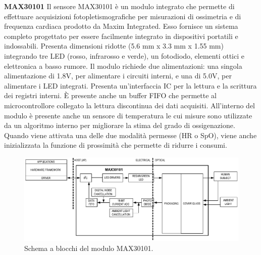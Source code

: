\textbf{MAX30101} Il sensore MAX30101 è un modulo integrato che permette di effettuare acquisizioni fotopletismografiche per misurazioni di ossimetria e di frequenza cardiaca prodotto da Maxim Integrated\cite{IntegratedMAX30101}. Esso fornisce un sistema completo progettato per essere facilmente integrato in dispositivi portatili e indossabili. Presenta dimensioni ridotte (5.6 mm x 3.3 mm x 1.55 mm) integrando tre LED (rosso, infrarosso e verde), un fotodiodo, elementi ottici e elettronica a basso rumore. Il modulo richiede due alimentazioni: una singola alimentazione di 1.8V, per alimentare i circuiti interni, e una di 5.0V, per alimentare i LED integrati. Presenta un'interfaccia IC per la lettura e la scrittura dei registri interni. \`E presente anche un buffer FIFO che permette al microcontrollore collegato la lettura discontinua dei dati acquisiti. All'interno del modulo è presente anche un sensore di temperatura le cui misure sono utilizzate da un algoritmo interno per migliorare la stima del grado di ossigenazione. Quando viene attivata una delle due modalità permesse (HR o SpO), viene anche inizializzata la funzione di prossimità che permette di ridurre i consumi.   
\begin{figure}[tb]
	\centering
	\includegraphics[width=1\linewidth]{ImageFiles/Fotopletismografia/MAX30101BlockDiagram}
	\caption{Schema a blocchi del modulo MAX30101.}
	\label{fig:MAX30101BlockDiagram}
\end{figure}

\pagebreak

